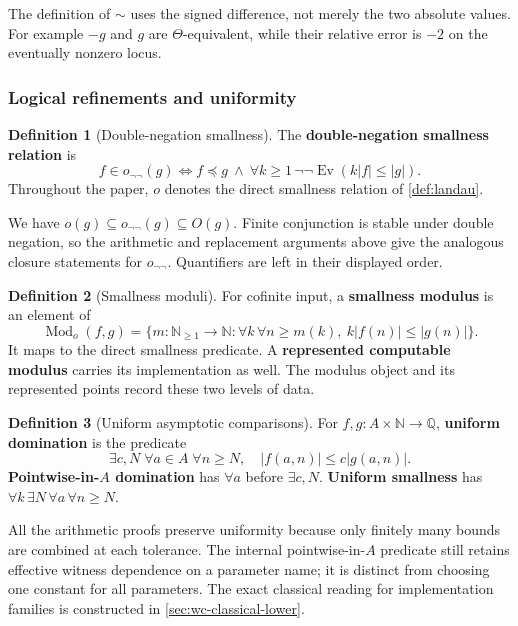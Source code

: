 \documentclass[11pt,a4paper]{article}
\numberwithin{algorithm}{section}
\numberwithin{equation}{section}
\theoremstyle{definition}
\newtheorem{definition}[definition]{Definition}
\theoremstyle{remark}
\theoremstyle{plain}
\newcommand{\N}{\mathbb N}
\newcommand{\QQ}{\mathbb Q}
\newcommand{\Ev}{{\operatorname{Ev}}}
\newcommand{\abs}[1]{\lvert #1\rvert}
\newcommand{\onn}{o_{\neg\neg}}
\theoremstyle{definition}
\theoremstyle{plain}
\begin{document}
The definition of $\sim$ uses the signed difference, not merely
the two absolute values. For example $-g$ and $g$ are
$\Theta$-equivalent, while their relative error is $-2$ on
the eventually nonzero locus.

\subsubsection{Logical refinements and uniformity}


\begin{definition}[Double-negation smallness]\label{def:double-negation-smallness}
The \textbf{double-negation smallness relation} is
\[
 f\in\onn(g)\iff f\preceq g\ \wedge\
 \forall k\ge1\,\neg\neg\Ev(k\abs f\le\abs g).
\]
Throughout the paper, $o$ denotes the direct smallness relation
of \cref{def:landau}.
\end{definition}


We have $o(g)\subseteq\onn(g)\subseteq O(g)$.
Finite conjunction is stable under double negation, so the
arithmetic and replacement arguments above give the analogous
closure statements for $\onn$. Quantifiers are left in their
displayed order.


\begin{definition}[Smallness moduli]\label{def:smallness-moduli}
For cofinite input, a \textbf{smallness modulus} is an element of
\[
 \operatorname{Mod}_o(f,g)=
 \{m:\N_{\ge1}\to\N:
   \forall k\,\forall n\ge m(k),\ k\abs{f(n)}\le\abs{g(n)}\}.
\]
It maps to the direct smallness predicate. A \textbf{represented computable modulus} carries its implementation as well.
The modulus object and its represented points record these two levels of data.
\end{definition}


\begin{definition}[Uniform asymptotic comparisons]\label{def:uniform-comparisons}
For $f,g:A\times\N\to\QQ$, \textbf{uniform domination} is the predicate
\[
 \exists c,N\;\forall a\in A\;\forall n\ge N,\quad
 \abs{f(a,n)}\le c\abs{g(a,n)}.
\]
\textbf{Pointwise-in-$A$ domination} has $\forall a$ before $\exists c,N$.
\textbf{Uniform smallness} has $\forall k\,\exists N\,\forall a\,\forall n\ge N$.
\end{definition}


All the arithmetic proofs preserve uniformity because only
finitely many bounds are combined at each tolerance. The internal
pointwise-in-$A$ predicate still retains effective witness dependence
on a parameter name; it is distinct from choosing one constant for
all parameters. The exact classical reading for implementation
families is constructed in \cref{sec:wc-classical-lower}.
\end{document}
